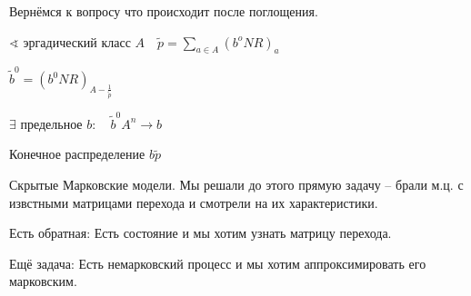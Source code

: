 \documentclass{book}
\newcommand{\tl}[1]{\widetilde{#1}}
\theoremstyle{definition}
\begin{document}
Вернёмся к вопросу что происходит после поглощения.

$\sphericalangle $ эргадический класс $A\quad \tl p = \sum_{a\in A}\left( b^oNR \right)_a $

$\tl b^0 = \left( b^0NR \right) _{A - \frac{1}{\tl p}}$ 

$\exists $ предельное $b:\quad \tl b^0 A^n \to b$

Конечное распределение $b\tl p$


Скрытые Марковские модели. Мы решали до этого прямую задачу -- брали м.ц. с извстными матрицами перехода и смотрели на их характеристики.

Есть обратная: Есть состояние и мы хотим узнать матрицу перехода.

Ещё задача: Есть немарковский процесс и мы хотим аппроксимировать его марковским.
\end{document}
